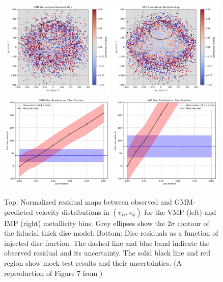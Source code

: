 \documentclass[a4paper,12pt]{article}
\begin{document}
\begin{figure}[ht]
    \centering
    \includegraphics[width=0.49\textwidth]{../figures/vmp_residual_map.png}
    \includegraphics[width=0.49\textwidth]{../figures/imp_residual_map.png} \\
    \includegraphics[width=0.49\textwidth]{../figures/vmp_disc_fraction.png}
    \includegraphics[width=0.49\textwidth]{../figures/imp_disc_fraction.png}
    \caption{Top: Normalized residual maps between observed and GMM-predicted 
    velocity distributions in $(v_R, v_\phi)$ for the VMP (left) and IMP (right) metallicity bins. 
    Grey ellipses show the $2\sigma$ contour of the fiducial thick disc model. Bottom: Disc residuals 
    as a function of injected disc fraction. The dashed line and blue band indicate the observed residual
     and its uncertainty. The solid black line and red region show mock test results and their uncertainties.
     (A reproduction of Figure 7 from \citet{zhang2024existencemetalpoordiscmilky})}
    \label{fig:residuals}
\end{figure}
\end{document}

